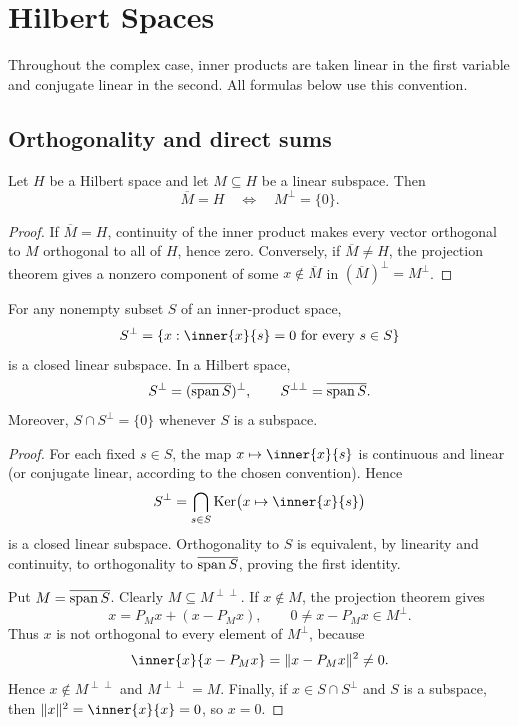 \chapter{Hilbert Spaces}

Throughout the complex case, inner products are taken linear in the first
variable and conjugate linear in the second.  All formulas below use this
convention.

\section{Orthogonality and direct sums}

\begin{noteproposition}
Let $H$ be a Hilbert space and let $M\subseteq H$ be a linear subspace.  Then
\[
  \overline M=H
  \quad\Longleftrightarrow\quad
  M^\perp=\{0\}.
\]
\end{noteproposition}

\begin{proof}
If $\overline M=H$, continuity of the inner product makes every vector
orthogonal to $M$ orthogonal to all of $H$, hence zero.  Conversely, if
$\overline M\ne H$, the projection theorem gives a nonzero component of some
$x\notin\overline M$ in $(\overline M)^\perp=M^\perp$.
\end{proof}

\begin{noteproposition}
For any nonempty subset $S$ of an inner-product space,
\[
  S^\perp=\{x:\inner{x}{s}=0\text{ for every }s\in S\}
\]
is a closed linear subspace.  In a Hilbert space,
\[
  S^\perp=(\overline{\operatorname{span} S})^\perp,
  \qquad
  S^{\perp\perp}=\overline{\operatorname{span} S}.
\]
Moreover, $S\cap S^\perp=\{0\}$ whenever $S$ is a subspace.
\end{noteproposition}

\begin{proof}
For each fixed $s\in S$, the map $x\mapsto\inner{x}{s}$ is continuous and
linear (or conjugate linear, according to the chosen convention).  Hence
\[
  S^\perp=\bigcap_{s\in S}\Ker\bigl(x\mapsto\inner{x}{s}\bigr)
\]
is a closed linear subspace.  Orthogonality to $S$ is equivalent, by linearity
and continuity, to orthogonality to $\overline{\operatorname{span} S}$, proving the first
identity.

Put $M=\overline{\operatorname{span} S}$.  Clearly $M\subseteq M^{\perp\perp}$.  If
$x\notin M$, the projection theorem gives
\[
  x=P_Mx+(x-P_Mx),
  \qquad 0\ne x-P_Mx\in M^\perp.
\]
Thus $x$ is not orthogonal to every element of $M^\perp$, because
\[
  \inner{x}{x-P_Mx}=\|x-P_Mx\|^2\ne0.
\]
Hence $x\notin M^{\perp\perp}$ and $M^{\perp\perp}=M$.  Finally, if
$x\in S\cap S^\perp$ and $S$ is a subspace, then
$\|x\|^2=\inner{x}{x}=0$, so $x=0$.
\end{proof}

